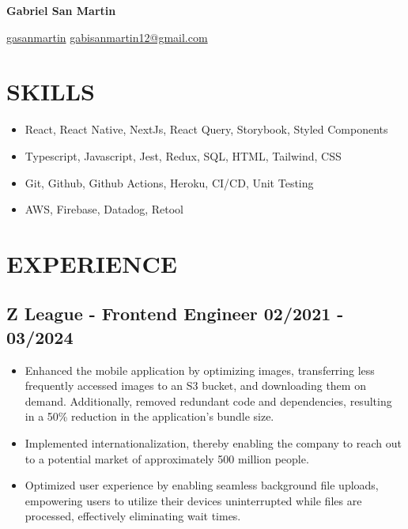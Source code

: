 \documentclass[12pt, letterpaper]{article}
\begin{document}
\begin{center}
    \textbf{\Huge Gabriel San Martin} \\ \vspace{3pt}

    \small
    \faLinkedin \hspace{.5pt} \href{https://www.linkedin.com/in/gasanmartin}{gasanmartin}
    \vline \hspace{.5pt}
    \faEnvelope \hspace{.5pt} \href{mailto:gabisanmartin12@gmail.com}{gabisanmartin12@gmail.com}
\end{center}

\section{SKILLS}

\begin{itemize}
    \setlength\itemsep{0em}
    \item React, React Native, NextJs, React Query, Storybook, Styled Components
    \item Typescript, Javascript, Jest, Redux, SQL, HTML, Tailwind, CSS
    \item Git, Github, Github Actions, Heroku, CI/CD, Unit Testing
    \item AWS, Firebase, Datadog, Retool
\end{itemize}

\section{EXPERIENCE}

\subsection*{Z League - Frontend Engineer \hfill \small 02/2021 - 03/2024}

\begin{itemize}
    \setlength\itemsep{0em}
    \item Enhanced the mobile application by optimizing images, transferring less frequently accessed images to an S3 bucket, and downloading them on demand. Additionally, removed redundant code and dependencies, resulting in a 50\% reduction in the application's bundle size.
    \item Implemented internationalization, thereby enabling the company to reach out to a potential market of approximately 500 million people.
    \item Optimized user experience by enabling seamless background file uploads, empowering users to utilize their devices uninterrupted while files are processed, effectively eliminating wait times.
\end{itemize}
\end{document}
